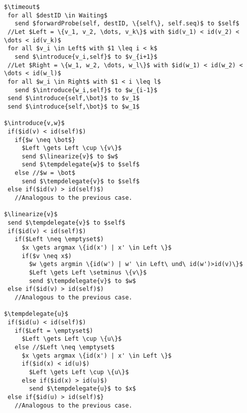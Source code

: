 \documentclass[a4paper,USenglish]{lipics}
\newcommand{\blp}{\textsc{Build-List+}\xspace}
\newcommand{\linearize}[1]{\textsc{Linearize(\ensuremath{#1})}\xspace}
\newcommand{\introduce}[1]{\textsc{Introduce(\ensuremath{#1})}\xspace}
\newcommand{\tempdelegate}[1]{\textsc{TempDelegate(\ensuremath{#1})}\xspace}
\newcommand{\timeout}{\textsc{Timeout}\xspace}
\begin{document}
\begin{lstlisting}[mathescape=true,float=*,caption=\blp protocol,label=algo:blp]
$\timeout$
 for all $destID \in Waiting$
   send $forwardProbe(self, destID, \{self\}, self.seq)$ to $self$
 //Let $Left = \{v_1, v_2, \dots, v_k\}$ with $id(v_1) < id(v_2) < \dots < id(v_k)$ 
 for all $v_i \in Left$ with $1 \leq i < k$
   send $\introduce{v_i,self}$ to $v_{i+1}$
 //Let $Right = \{w_1, w_2, \dots, w_l\}$ with $id(w_1) < id(w_2) < \dots < id(w_l)$    
 for all $w_i \in Right$ with $1 < i \leq l$
   send $\introduce{w_i,self}$ to $w_{i-1}$
 send $\introduce{self,\bot}$ to $v_1$
 send $\introduce{self,\bot}$ to $w_1$

$\introduce{v,w}$ 
 if($id(v) < id(self)$)
   if{$w \neq \bot$}
     $Left \gets Left \cup \{v\}$
     send $\linearize{v}$ to $w$
     send $\tempdelegate{w}$ to $self$
   else //$w = \bot$
     send $\tempdelegate{v}$ to $self$
 else if($id(v) > id(self)$) 
   //Analogous to the previous case.
    
$\linearize{v}$
 send $\tempdelegate{v}$ to $self$
 if($id(v) < id(self)$)
   if($Left \neq \emptyset$)
     $x \gets argmax \{id(x') | x' \in Left \}$
     if($v \neq x$)
       $w \gets argmin \{id(w') | w' \in Left\ und\ id(w')>id(v)\}$
       $Left \gets Left \setminus \{v\}$
       send $\tempdelegate{v}$ to $w$
 else if($id(v) > id(self)$) 
   //Analogous to the previous case. 
 
$\tempdelegate{u}$
 if($id(u) < id(self)$)
   if($Left = \emptyset$)
     $Left \gets Left \cup \{u\}$ 
   else //$Left \neq \emptyset$
     $x \gets argmax \{id(x') | x' \in Left \}$
     if($id(x) < id(u)$)
       $Left \gets Left \cup \{u\}$
     else if($id(x) > id(u)$)
       send $\tempdelegate{u}$ to $x$
 else if{$id(u) > id(self)$} 
   //Analogous to the previous case. 

\end{lstlisting}
\end{document}
